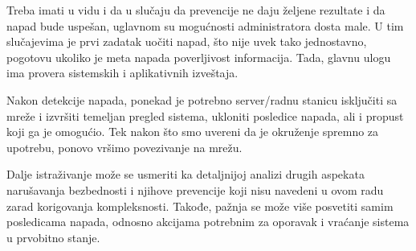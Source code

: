 \documentclass[a4paper]{article}
\begin{document}
Treba imati u vidu i da u slučaju da prevencije ne daju željene rezultate i da napad bude uspešan, uglavnom su mogućnosti administratora dosta male. U tim slučajevima je prvi zadatak uočiti napad, što nije uvek tako jednostavno, pogotovu ukoliko je meta napada poverljivost informacija. Tada, glavnu ulogu ima provera sistemskih i aplikativnih izveštaja.

Nakon detekcije napada, ponekad je potrebno server/radnu stanicu isključiti sa mreže i izvršiti temeljan pregled sistema, ukloniti posledice napada, ali i propust koji ga je omogućio. Tek nakon što smo uvereni da je okruženje spremno za upotrebu, ponovo vršimo povezivanje na mrežu.

Dalje istraživanje može se usmeriti ka detaljnijoj analizi drugih aspekata narušavanja bezbednosti i njihove prevencije koji nisu navedeni u ovom radu zarad korigovanja kompleksnosti. Takođe, pažnja se može više posvetiti samim posledicama napada, odnosno akcijama potrebnim za oporavak i vraćanje sistema u prvobitno stanje.


\nocite{*}
\appendix
{}


\end{document}
